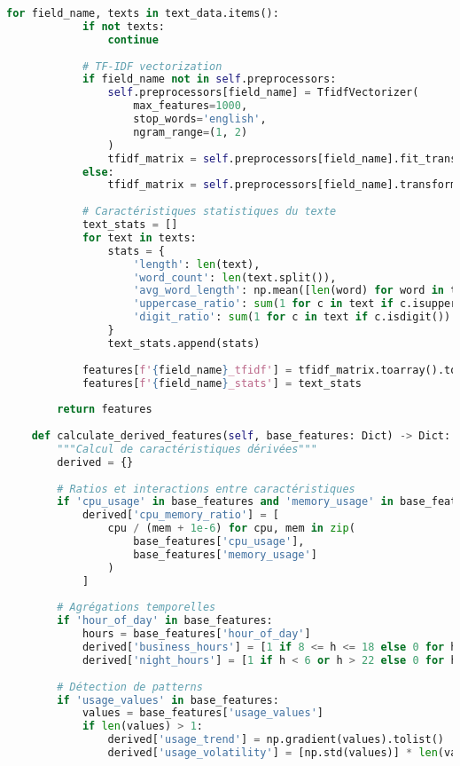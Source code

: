 \documentclass[12pt,a4paper]{report}
\begin{document}
\begin{lstlisting}[language=Python, caption=Pipeline de données IA avec monitoring avancé]
        for field_name, texts in text_data.items():
            if not texts:
                continue
            
            # TF-IDF vectorization
            if field_name not in self.preprocessors:
                self.preprocessors[field_name] = TfidfVectorizer(
                    max_features=1000,
                    stop_words='english',
                    ngram_range=(1, 2)
                )
                tfidf_matrix = self.preprocessors[field_name].fit_transform(texts)
            else:
                tfidf_matrix = self.preprocessors[field_name].transform(texts)
            
            # Caractéristiques statistiques du texte
            text_stats = []
            for text in texts:
                stats = {
                    'length': len(text),
                    'word_count': len(text.split()),
                    'avg_word_length': np.mean([len(word) for word in text.split()]) if text.split() else 0,
                    'uppercase_ratio': sum(1 for c in text if c.isupper()) / len(text) if text else 0,
                    'digit_ratio': sum(1 for c in text if c.isdigit()) / len(text) if text else 0
                }
                text_stats.append(stats)
            
            features[f'{field_name}_tfidf'] = tfidf_matrix.toarray().tolist()
            features[f'{field_name}_stats'] = text_stats
        
        return features
    
    def calculate_derived_features(self, base_features: Dict) -> Dict:
        """Calcul de caractéristiques dérivées"""
        derived = {}
        
        # Ratios et interactions entre caractéristiques
        if 'cpu_usage' in base_features and 'memory_usage' in base_features:
            derived['cpu_memory_ratio'] = [
                cpu / (mem + 1e-6) for cpu, mem in zip(
                    base_features['cpu_usage'], 
                    base_features['memory_usage']
                )
            ]
        
        # Agrégations temporelles
        if 'hour_of_day' in base_features:
            hours = base_features['hour_of_day']
            derived['business_hours'] = [1 if 8 <= h <= 18 else 0 for h in hours]
            derived['night_hours'] = [1 if h < 6 or h > 22 else 0 for h in hours]
        
        # Détection de patterns
        if 'usage_values' in base_features:
            values = base_features['usage_values']
            if len(values) > 1:
                derived['usage_trend'] = np.gradient(values).tolist()
                derived['usage_volatility'] = [np.std(values)] * len(values)
        

\end{lstlisting}
\end{document}
